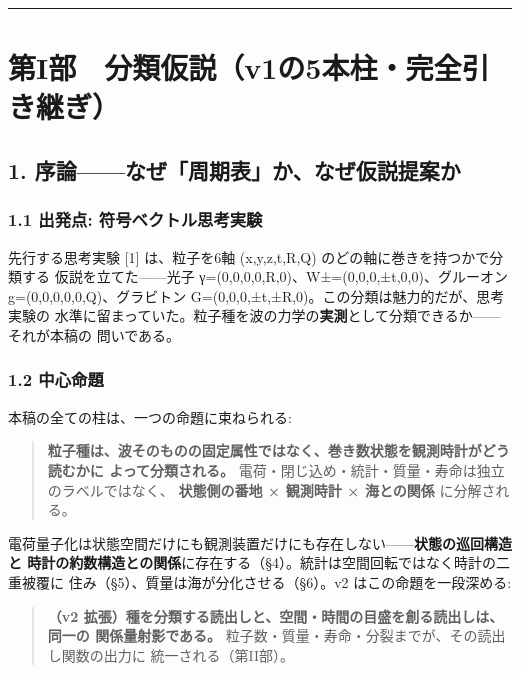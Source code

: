 \documentclass[
]{ltjarticle}
\begin{document}
\begin{center}\rule{0.5\linewidth}{0.5pt}\end{center}

\section{第I部　分類仮説（v1の5本柱・完全引き継ぎ）}\label{ux7b2ciux90e8-ux5206ux985eux4eeeux8aacv1ux306e5ux672cux67f1ux5b8cux5168ux5f15ux304dux7d99ux304e}

\subsection{1.
序論------なぜ「周期表」か、なぜ仮説提案か}\label{ux5e8fux8ad6ux306aux305cux5468ux671fux8868ux304bux306aux305cux4eeeux8aacux63d0ux6848ux304b}

\subsubsection{1.1 出発点:
符号ベクトル思考実験}\label{ux51faux767aux70b9-ux7b26ux53f7ux30d9ux30afux30c8ux30ebux601dux8003ux5b9fux9a13}

先行する思考実験 {[}1{]} は、粒子を6軸 (x,y,z,t,R,Q)
のどの軸に巻きを持つかで分類する 仮説を立てた------光子
γ=(0,0,0,0,R,0)、W±=(0,0,0,±t,0,0)、グルーオン
g=(0,0,0,0,0,Q)、グラビトン
G=(0,0,0,±t,±R,0)。この分類は魅力的だが、思考実験の
水準に留まっていた。粒子種を波の力学の\textbf{実測}として分類できるか------それが本稿の
問いである。

\subsubsection{1.2 中心命題}\label{ux4e2dux5fc3ux547dux984c}

本稿の全ての柱は、一つの命題に束ねられる:

\begin{quote}
\textbf{粒子種は、波そのものの固定属性ではなく、巻き数状態を観測時計がどう読むかに
よって分類される。}
電荷・閉じ込め・統計・質量・寿命は独立のラベルではなく、
\textbf{状態側の番地 × 観測時計 × 海との関係} に分解される。
\end{quote}

電荷量子化は状態空間だけにも観測装置だけにも存在しない------\textbf{状態の巡回構造と
時計の約数構造との関係}に存在する（§4）。統計は空間回転ではなく時計の二重被覆に
住み（§5）、質量は海が分化させる（§6）。v2 はこの命題を一段深める:

\begin{quote}
\textbf{（v2
拡張）種を分類する読出しと、空間・時間の目盛を創る読出しは、同一の
関係量射影である。}
粒子数・質量・寿命・分裂までが、その読出し関数の出力に
統一される（第II部）。
\end{quote}
\end{document}

